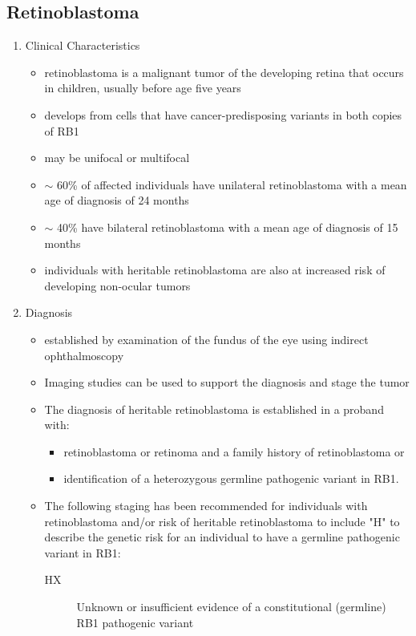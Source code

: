 \documentclass[12pt]{scrartcl}
\begin{document}
\subsection{Retinoblastoma}
\label{sec:orge59383f}
\begin{enumerate}
\item Clinical Characteristics
\label{sec:org0f4c2a1}
\begin{itemize}
\item retinoblastoma is a malignant tumor of the developing retina that
occurs in children, usually before age five years
\item develops from cells that have cancer-predisposing variants in both
copies of RB1
\item may be unifocal or multifocal
\item \(\sim\) 60\% of affected individuals have unilateral retinoblastoma with
a mean age of diagnosis of 24 months
\item \(\sim\) 40\% have bilateral retinoblastoma with a mean age of diagnosis
of 15 months
\item individuals with heritable retinoblastoma are also at increased risk
of developing non-ocular tumors
\end{itemize}

\item Diagnosis
\label{sec:org324d12a}
\begin{itemize}
\item established by examination of the fundus of the eye using indirect
ophthalmoscopy
\item Imaging studies can be used to support the diagnosis and stage the tumor
\item The diagnosis of heritable retinoblastoma is established in a
proband with:
\begin{itemize}
\item retinoblastoma or retinoma and a family history of retinoblastoma or
\item identification of a heterozygous germline pathogenic variant in RB1.
\end{itemize}

\item The following staging has been recommended for individuals with
retinoblastoma and/or risk of heritable retinoblastoma to include
"H" to describe the genetic risk for an individual to have a
germline pathogenic variant in RB1:

\begin{description}
\item[{HX}] Unknown or insufficient evidence of a constitutional
(germline) RB1 pathogenic variant


\end{description}
\end{itemize}
\end{enumerate}
\end{document}
